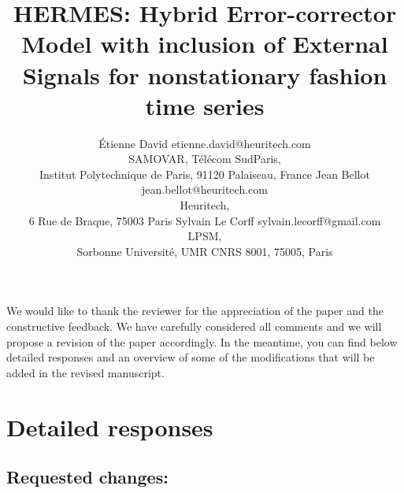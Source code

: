 \documentclass[10pt]{article} %
\title{HERMES: Hybrid Error-corrector Model with inclusion of External Signals for nonstationary fashion time series}
\author{\name \'Etienne David \email etienne.david@heuritech.com \\
      \addr SAMOVAR, Télécom SudParis,\\
      Institut Polytechnique de Paris, 91120 Palaiseau, France
      \AND
      \name Jean Bellot \email jean.bellot@heuritech.com \\
      \addr Heuritech, \\
      6 Rue de Braque, 75003 Paris
      \AND
      \name Sylvain Le Corff \email sylvain.lecorff@gmail.com\\
      \addr LPSM, \\
      Sorbonne Université, UMR CNRS 8001, 75005, Paris
      }
\begin{document}
\maketitle

We would like to thank the reviewer for the appreciation of the paper and the constructive feedback. We have carefully considered all comments and we will propose a revision of the paper accordingly. In the meantime, you can find below detailed responses and an overview of some of the  modifications that will be added in the revised manuscript.

\section*{Detailed responses}

\subsection*{Requested changes:}
\end{document}
